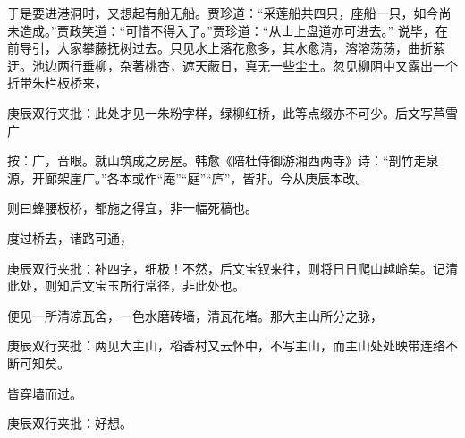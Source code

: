 \begin{parag}
    于是要进港洞时，又想起有船无船。贾珍道：“采莲船共四只，座船一只，如今尚未造成。”贾政笑道：“可惜不得入了。”贾珍道：“从山上盘道亦可进去。” 说毕，在前导引，大家攀藤抚树过去。只见水上落花愈多，其水愈清，溶溶荡荡，曲折萦迂。池边两行垂柳，杂著桃杏，遮天蔽日，真无一些尘土。忽见柳阴中又露出一个折带朱栏板桥来，\begin{note}庚辰双行夹批：此处才见一朱粉字样，绿柳红桥，此等点缀亦不可少。后文写芦雪广\end{note}\begin{subnote}按：广，音眼。就山筑成之房屋。韩愈《陪杜侍御游湘西两寺》诗：“剖竹走泉源，开廊架崖广。”各本或作“庵”“庭”“庐”，皆非。今从庚辰本改。\end{subnote}\begin{note}则曰蜂腰板桥，都施之得宜，非一幅死稿也。\end{note}度过桥去，诸路可通，\begin{note}庚辰双行夹批：补四字，细极！不然，后文宝钗来往，则将日日爬山越岭矣。记清此处，则知后文宝玉所行常径，非此处也。\end{note}便见一所清凉瓦舍，一色水磨砖墙，清瓦花堵。那大主山所分之脉，\begin{note}庚辰双行夹批：两见大主山，稻香村又云怀中，不写主山，而主山处处映带连络不断可知矣。\end{note}皆穿墙而过。\begin{note}庚辰双行夹批：好想。\end{note}
\end{parag}


